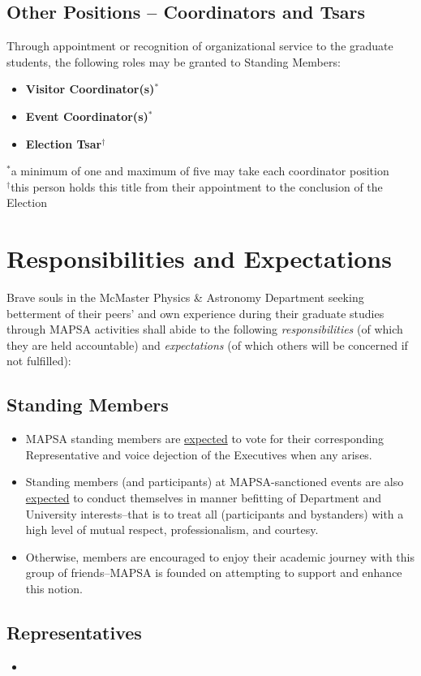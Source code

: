 \documentclass[8pt]{article}
\begin{document}
	\subsection{Other Positions -- Coordinators and Tsars}
	Through appointment or recognition of organizational service to the graduate students, the following roles may be granted to Standing Members:
	\begin{itemize}
		\item \textbf{Visitor Coordinator(s)$^*$}
		\item \textbf{Event Coordinator(s)$^*$}
		\item \textbf{Election Tsar$^\dagger$}
	\end{itemize}
	$^*$a minimum of one and maximum of five may take each coordinator position\\
	$^\dagger$this person holds this title from their appointment to the conclusion of the Election
	\section{Responsibilities and Expectations}
	Brave souls in the McMaster Physics \& Astronomy Department seeking betterment of their peers' and own experience during their graduate studies through MAPSA activities shall abide to the following \textit{responsibilities} (of which they are held accountable) and \textit{expectations} (of which others will be concerned if not fulfilled):
	\subsection{Standing Members}
	\begin{itemize}
		\item MAPSA standing members are \underline{expected} to vote for their corresponding Representative and voice dejection of the Executives when any arises. 
		\item Standing members (and participants) at MAPSA-sanctioned events are also \underline{expected} to conduct themselves in manner befitting of Department and University interests--that is to treat all (participants and bystanders) with a high level of mutual respect, professionalism, and courtesy. 
		\item Otherwise, members are encouraged to enjoy their academic journey with this group of friends--MAPSA is founded on attempting to support and enhance this notion.
	\end{itemize}
	\subsection{Representatives}
	\begin{itemize}
		\item
	\end{itemize}
\end{document}
